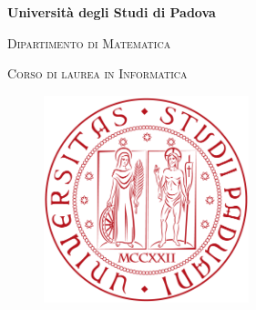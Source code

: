 \begin{titlepage}

\begin{center}

\begin{LARGE}
\textbf{Università degli Studi di Padova}\\
\end{LARGE}

\vspace{10pt}

\begin{Large}
\textsc{Dipartimento di Matematica}\\
\end{Large}

\vspace{10pt}

\begin{large}
\textsc{Corso di laurea in Informatica}\\
\end{large}

\vspace{30pt}
\begin{figure}[htbp]
\begin{center}
\includegraphics[height=6cm]{images/logo-unipd.png}
\end{center}
\end{figure}
\vspace{30pt} 

\begin{LARGE}
\begin{center}
\textbf{\mytitle}\\
\end{center}
\end{LARGE}

\vspace{10pt} 

\begin{large}
\textsl{\mydegree}\\
\end{large}


\end{center}
\end{titlepage}
